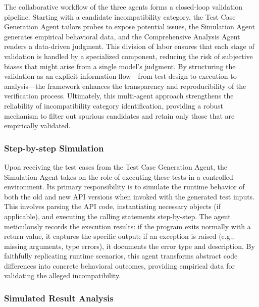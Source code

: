 The collaborative workflow of the three agents forms a closed-loop validation pipeline. Starting with a candidate incompatibility category, the Test Case Generation Agent tailors probes to expose potential issues, the Simulation Agent generates empirical behavioral data, and the Comprehensive Analysis Agent renders a data-driven judgment. This division of labor ensures that each stage of validation is handled by a specialized component, reducing the risk of subjective biases that might arise from a single model’s judgment. By structuring the validation as an explicit information flow—from test design to execution to analysis—the framework enhances the transparency and reproducibility of the verification process. Ultimately, this multi-agent approach strengthens the reliability of incompatibility category identification, providing a robust mechanism to filter out spurious candidates and retain only those that are empirically validated.

\subsubsection{Step-by-step Simulation}

Upon receiving the test cases from the Test Case Generation Agent, the Simulation Agent takes on the role of executing these tests in a controlled environment. Its primary responsibility is to simulate the runtime behavior of both the old and new API versions when invoked with the generated test inputs. This involves parsing the API code, instantiating necessary objects (if applicable), and executing the calling statements step-by-step. The agent meticulously records the execution results: if the program exits normally with a return value, it captures the specific output; if an exception is raised (e.g., missing arguments, type errors), it documents the error type and description. By faithfully replicating runtime scenarios, this agent transforms abstract code differences into concrete behavioral outcomes, providing empirical data for validating the alleged incompatibility.


\subsubsection{Simulated Result Analysis}

